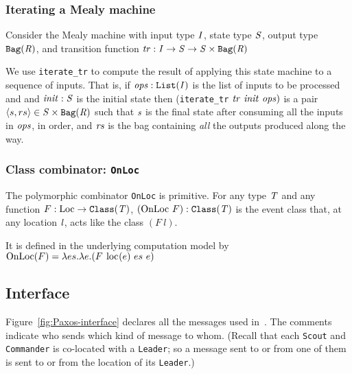 \documentclass[final]{article}
\newcommand{\listinline}[1]{\text{\lstinline{#1}}}
\begin{document}
\subsubsection{Iterating a Mealy machine}

Consider the Mealy machine with input type $\mathit{I}$, state type
$\mathit{S}$, output type $\mathtt{Bag}(\mathit{R})$, and transition
function
%
$\mathit{tr}:\mathit{I}\rightarrow\mathit{S}\rightarrow\mathit{S}\times\mathtt{Bag}(\mathit{R})$

We use \lstinline{iterate_tr} to compute the result of applying this
state machine to a sequence of inputs.  That is, if
$\mathit{ops}:\mathtt{List}(\mathit{I})$ is the list of inputs to be
processed and and $\mathit{init}:\mathit{S}$ is the initial state then
(\lstinline{iterate_tr}$~\mathit{tr}~\mathit{init}~\mathit{ops})$ is a
pair $\langle s,rs\rangle\in\mathit{S}\times\mathtt{Bag}(\mathit{R})$
such that $\mathit{s}$ is the final state after consuming all the
inputs in $\mathit{ops}$, in order, and $\mathit{rs}$ is the bag
containing \emph{all} the outputs produced along the way.


\subsubsection{Class combinator: \lstinline{OnLoc}}\label{OnLoc-defined}

The polymorphic combinator \lstinline{OnLoc}
%
%
%
is primitive.  For any type $\mathit{T}$ and any function
$F:\NUPRLarrow{\listinline{Loc}}{\NUPRLclass{\NUPRL{T}}}$,
$(\listinline{OnLoc}~F):\NUPRLclass{\NUPRL{T}}$ is the event
class that, at any location $\mathit{l}$, acts like the class $(F~l)$.

It is defined in the underlying computation model by
\(
 \listinline{OnLoc}(F) = \lambda es.\lambda e.(F~\listinline{loc}(e)~es~e)
\)

\subsection{Interface}

Figure~\ref{fig:Paxos-interface} declares all the messages used
in~\cite{VanRenesse:2011}.  The comments indicate who sends which kind
of message to whom.  (Recall that each \lstinline{Scout} and
\lstinline{Commander} is co-located with a \lstinline{Leader}; so a
message sent to or from one of them is sent to or from the location of
its \lstinline{Leader}.)
\end{document}

